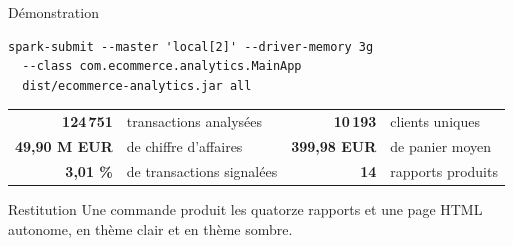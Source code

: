 \documentclass[aspectratio=169,11pt]{beamer}
\begin{document}
\begin{frame}[fragile]{Démonstration}
  \vspace{2mm}
\begin{lstlisting}
spark-submit --master 'local[2]' --driver-memory 3g
  --class com.ecommerce.analytics.MainApp
  dist/ecommerce-analytics.jar all
\end{lstlisting}

  \vspace{4mm}
  \begin{center}
  \small
  \begin{tabular}{@{}r l r l@{}}
    \toprule
    \textbf{124\,751} & transactions analysées & \textbf{10\,193} & clients uniques \\
    \textbf{49,90 M EUR} & de chiffre d'affaires & \textbf{399,98 EUR} & de panier moyen \\
    \textbf{3,01 \%} & de transactions signalées & \textbf{14} & rapports produits \\
    \bottomrule
  \end{tabular}
  \end{center}

  \vspace{3mm}
  \begin{block}{Restitution}
    Une commande produit les quatorze rapports et une page HTML autonome,
    en thème clair et en thème sombre.
  \end{block}

\end{frame}
\end{document}
